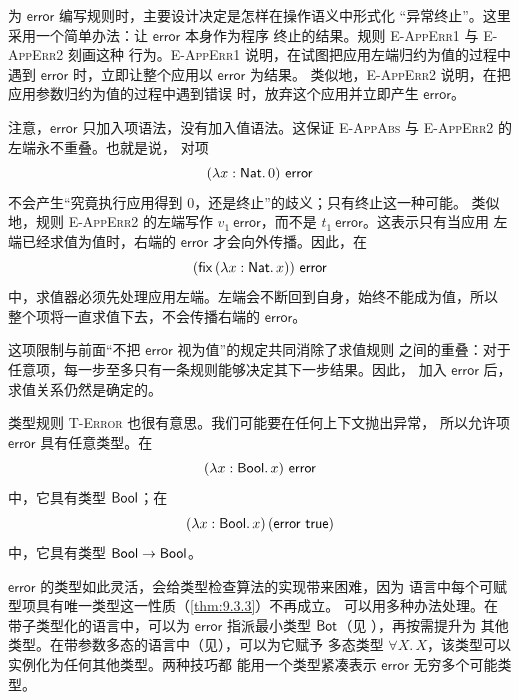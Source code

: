 为 \(\mathsf{error}\) 编写规则时，主要设计决定是怎样在操作语义中形式化
“异常终止”。这里采用一个简单办法：让 \(\mathsf{error}\) 本身作为程序
终止的结果。规则 \textsc{E-AppErr1} 与 \textsc{E-AppErr2} 刻画这种
行为。\textsc{E-AppErr1} 说明，在试图把应用左端归约为值的过程中遇到
\(\mathsf{error}\) 时，立即让整个应用以 \(\mathsf{error}\) 为结果。
类似地，\textsc{E-AppErr2} 说明，在把应用参数归约为值的过程中遇到错误
时，放弃这个应用并立即产生 \(\mathsf{error}\)。

注意，\(\mathsf{error}\) 只加入项语法，没有加入值语法。这保证
\textsc{E-AppAbs} 与 \textsc{E-AppErr2} 的左端永不重叠。也就是说，
对项
\[
(\lambda x:\tapltype{Nat}.\,0)\ \mathsf{error}
\]
不会产生“究竟执行应用得到 \(0\)，还是终止”的歧义；只有终止这一种可能。
类似地，规则 \textsc{E-AppErr2} 的左端写作
\(v_1\ \mathsf{error}\)，而不是 \(t_1\ \mathsf{error}\)。这表示只有当应用
左端已经求值为值时，右端的 \(\mathsf{error}\) 才会向外传播。因此，在
\[
(\mathsf{fix}\,(\lambda x:\tapltype{Nat}.\,x))\ \mathsf{error}
\]
中，求值器必须先处理应用左端。左端会不断回到自身，始终不能成为值，所以
整个项将一直求值下去，不会传播右端的 \(\mathsf{error}\)。

这项限制与前面“不把 \(\mathsf{error}\) 视为值”的规定共同消除了求值规则
之间的重叠：对于任意项，每一步至多只有一条规则能够决定其下一步结果。因此，
加入 \(\mathsf{error}\) 后，求值关系仍然是确定的。

类型规则 \textsc{T-Error} 也很有意思。我们可能要在任何上下文抛出异常，
所以允许项 \(\mathsf{error}\) 具有任意类型。在
\[
(\lambda x:\mathsf{Bool}.\,x)\ \mathsf{error}
\]
中，它具有类型 \(\mathsf{Bool}\)；在
\[
(\lambda x:\mathsf{Bool}.\,x)\,
(\mathsf{error}\ \mathsf{true})
\]
中，它具有类型 \(\mathsf{Bool}\to\mathsf{Bool}\)。


\(\mathsf{error}\) 的类型如此灵活，会给类型检查算法的实现带来困难，因为
语言中每个可赋型项具有唯一类型这一性质（\cref{thm:9.3.3}）不再成立。
可以用多种办法处理。在带子类型化的语言中，可以为 \(\mathsf{error}\)
指派最小类型 \(\mathsf{Bot}\)（见
），再按需提升为
其他类型。在带参数多态的语言中（见），可以为它赋予
多态类型 \(\forall X.\,X\)，该类型可以实例化为任何其他类型。两种技巧都
能用一个类型紧凑表示 \(\mathsf{error}\) 无穷多个可能类型。

